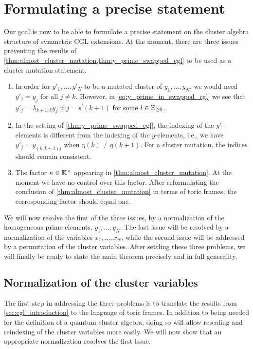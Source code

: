 \section{Formulating a precise statement}\label{sec:formulating_theorem}

Our goal is now to be able to formulate a precise statement on the cluster algebra
structure of symmetric CGL extensions. At the moment, there are three issues preventing
the results of \cref{thm:almost_cluster_mutation,thm:y_prime_swapped_cgl} to be used as
a cluster mutation statement.

\begin{enumerate}
	\item In order for $y'_1, \dots, y'_N$ to be a mutated cluster of $y_1, \dots, y_N$, we would
	      need $y'_j = y_j$ for all $j \neq k$. However, in \cref{eq:y_prime_in_swapped_cgl} we
	      see that $y'_j = \lambda_{k+1,k}y_j$ if $j = s^l(k+1)$ for some $l \in \mathbb{Z}_{\geq 0}$.
	\item In the setting of \cref{thm:y_prime_swapped_cgl}, the indexing of the $y'$-elements is
	      different from the indexing of the $y$-elements, i.e., we have $y'_j = y_{(k,k+1)j}$
	      when $\eta(k) \neq \eta(k+1)$. For a cluster mutation, the indices should remain
	      consistent.
	\item The factor $\kappa \in \mathbb{K}^\times$ appearing in \cref{thm:almost_cluster_mutation}. At
	      the moment we have no control over this factor. After reformulating the conclusion of
	      \cref{thm:almost_cluster_mutation} in terms of toric frames, the corresponding factor
	      should equal one.
\end{enumerate}

We will now resolve the first of the three issues, by a normalization of the
homogeneous prime elements, $y_1, \dots, y_N$. The last issue will be resolved by a
normalization of the variables $x_1, \dots, x_N$, while the second issue will be
addressed by a permutation of the cluster variables. After settling these three
problems, we will finally be ready to state the main theorem precisely and in full
generality.

\subsection{Normalization of the cluster variables}

The first step in addressing the three problems is to translate the results from
\cref{sec:cgl_introduction} to the language of toric frames. In addition to being
needed for the definition of a quantum cluster algebra, doing so will allow rescaling
and reindexing of the cluster variables more easily. We will now show that an
appropriate normalization resolves the first issue.

